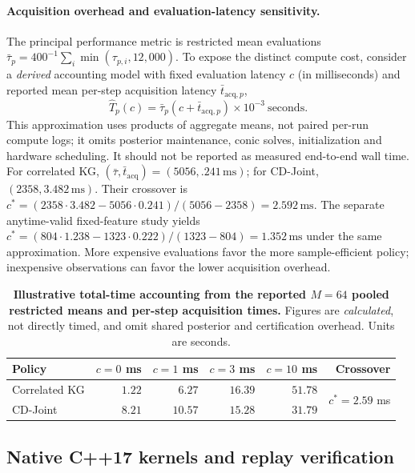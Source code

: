 \documentclass{article}
\theoremstyle{plain}
\theoremstyle{definition}
\begin{document}
\paragraph{Acquisition overhead and evaluation-latency sensitivity.}
The principal performance metric is restricted mean evaluations $\bar\tau_p=400^{-1}\sum_i\min(\tau_{p,i},12{,}000)$. To expose the distinct compute cost, consider a \emph{derived} accounting model with fixed evaluation latency $c$ (in milliseconds) and reported mean per-step acquisition latency $\bar t_{\mathrm{acq},p}$,
\begin{equation}
\widehat T_p(c)=\bar\tau_p(c+\bar t_{\mathrm{acq},p})\times10^{-3}\ \text{seconds}.
\label{eq:app-v12-cost-crossover}
\end{equation}
This approximation uses products of aggregate means, not paired per-run compute logs; it omits posterior maintenance, conic solves, initialization and hardware scheduling. It should not be reported as measured end-to-end wall time. For correlated KG, $(\bar\tau,\bar t_{\mathrm{acq}})=(5056,.241\,\mathrm{ms})$; for CD-Joint, $(2358,3.482\,\mathrm{ms})$. Their crossover is $c^*=(2358\cdot3.482-5056\cdot0.241)/(5056-2358)=2.592\,\mathrm{ms}$. The separate anytime-valid fixed-feature study yields $c^*=(804\cdot1.238-1323\cdot0.222)/(1323-804)=1.352\,\mathrm{ms}$ under the same approximation. More expensive evaluations favor the more sample-efficient policy; inexpensive observations can favor the lower acquisition overhead.
\begin{table}[!htbp]
\centering\small
\caption{\textbf{Illustrative total-time accounting from the reported $M=64$ pooled restricted means and per-step acquisition times.} Figures are \emph{calculated}, not directly timed, and omit shared posterior and certification overhead. Units are seconds.}
\label{tab:app-v12-total-cost}
\begin{tabular}{@{}lrrrrr@{}}
\toprule
Policy & $c=0$ ms & $c=1$ ms & $c=3$ ms & $c=10$ ms & Crossover \\
\midrule
Correlated KG & $1.22$ & $6.27$ & $16.39$ & $51.78$ & \multirow{2}{*}{$c^*=2.59$ ms} \\
CD-Joint & $8.21$ & $10.57$ & $15.28$ & $31.79$ & \\
\bottomrule
\end{tabular}
\end{table}

\subsection{Native C++17 kernels and replay verification}
\end{document}
